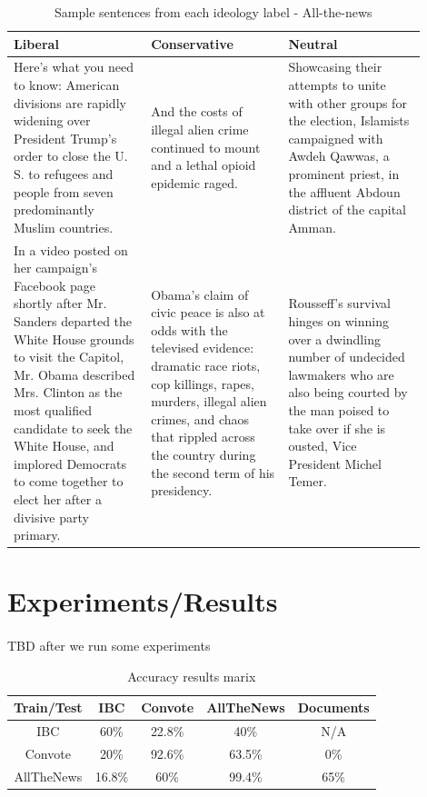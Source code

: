 \documentclass[10pt,a4paper,onecolumn]{article}
\begin{document}
\begin{table}[h!]
	\begin{center}
		\caption{Sample sentences from each ideology label - All-the-news	}
		\label{tab:atn-sentences}
		\begin{tabular}{p{0.3\linewidth}|p{0.3\linewidth}|p{0.3\linewidth}}
			\hline\hline
			\textbf{Liberal} & \textbf{Conservative} & \textbf{Neutral}\\
			\hline
			Here’s what you need to know: American divisions are rapidly widening over President Trump’s order to close the U. S. to refugees and people from seven predominantly Muslim countries. & And the costs of illegal alien crime continued to mount and a lethal opioid epidemic raged. & Showcasing their attempts to unite with other groups for the election, Islamists campaigned with Awdeh Qawwas, a prominent priest, in the affluent Abdoun district of the capital Amman. \\
			In a video posted on her campaign’s Facebook page shortly after Mr. Sanders departed the White House grounds to visit the Capitol, Mr. Obama described Mrs. Clinton as the most qualified candidate to seek the White House, and implored Democrats to come together to elect her after a divisive party primary. & Obama’s claim of civic peace is also at odds with the televised evidence: dramatic race riots, cop killings, rapes, murders, illegal alien crimes, and chaos that rippled across the country during the second term of his presidency. & Rousseff’s survival hinges on winning over a dwindling number of undecided lawmakers who are also being courted by the man poised to take over if she is ousted, Vice President Michel Temer. \\
			\hline\hline
		\end{tabular}
	\end{center}
\end{table}

\section{Experiments/Results}
\paragraph{}
TBD after we run some experiments

\begin{table}[h!]
\centering
\begin{tabular}{||c c c c c||} 
 \hline
 Train/Test & IBC & Convote & AllTheNews & Documents \\ [0.5ex] 
 \hline\hline
 IBC & 60\% & 22.8\% & 40\% & N/A \\ 
 Convote & 20\% & 92.6\% & 63.5\% & 0\% \\
 AllTheNews & 16.8\% & 60\% & 99.4\% & 65\% \\ [1ex]
 \hline
\end{tabular}
\caption{Accuracy results marix}
\label{table:1}
\end{table}
\end{document}
